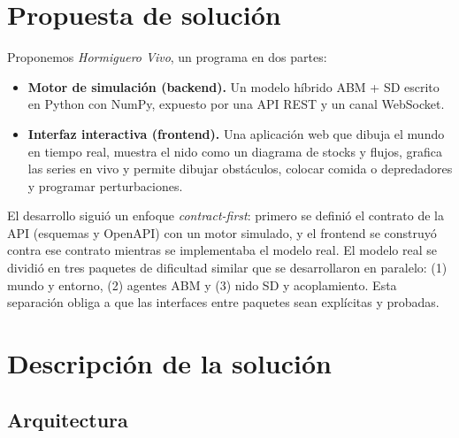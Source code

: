 \documentclass[11pt,a4paper]{article}
\begin{document}
\section{Propuesta de solución}

Proponemos \textit{Hormiguero Vivo}, un programa en dos partes:

\begin{itemize}
  \item \textbf{Motor de simulación (backend).} Un modelo híbrido ABM + SD escrito en Python con NumPy, expuesto por una API REST y un canal WebSocket.
  \item \textbf{Interfaz interactiva (frontend).} Una aplicación web que dibuja el mundo en tiempo real, muestra el nido como un diagrama de stocks y flujos, grafica las series en vivo y permite dibujar obstáculos, colocar comida o depredadores y programar perturbaciones.
\end{itemize}

El desarrollo siguió un enfoque \textit{contract-first}: primero se definió el contrato de la API (esquemas y OpenAPI) con un motor simulado, y el frontend se construyó contra ese contrato mientras se implementaba el modelo real. El modelo real se dividió en tres paquetes de dificultad similar que se desarrollaron en paralelo: (1) mundo y entorno, (2) agentes ABM y (3) nido SD y acoplamiento. Esta separación obliga a que las interfaces entre paquetes sean explícitas y probadas.

\section{Descripción de la solución}

\subsection{Arquitectura}
\end{document}
